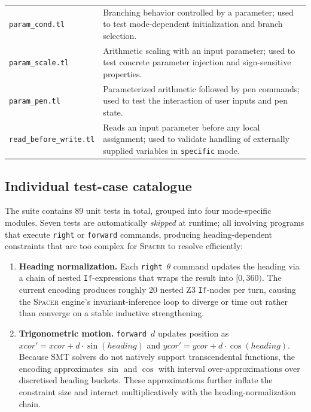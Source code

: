 \begin{longtable}{p{} p{}}
\texttt{param\_cond.tl} & Branching behavior controlled by a parameter; used to test mode-dependent initialization and branch selection. \\
\texttt{param\_scale.tl} & Arithmetic scaling with an input parameter; used to test concrete parameter injection and sign-sensitive properties. \\
\texttt{param\_pen.tl} & Parameterized arithmetic followed by pen commands; used to test the interaction of user inputs and pen state. \\
\texttt{read\_before\_write.tl} & Reads an input parameter before any local assignment; used to validate handling of externally supplied variables in \texttt{specific} mode. \\
\bottomrule
\end{longtable}

\subsection*{Individual test-case catalogue}

The suite contains 89 unit tests in total, grouped into four mode-specific modules.
Seven tests are automatically \emph{skipped} at runtime; all involving
programs that execute \texttt{right} or \texttt{forward} commands, producing
heading-dependent constraints that are too complex for \textsc{Spacer} to resolve
efficiently:

\begin{enumerate}[leftmargin=1.5em]
    \item \textbf{Heading normalization.}
    Each \texttt{right}~$\theta$ command updates the heading via a chain of
    nested \texttt{If}-expressions that wraps the result into $[0,360)$.
    The current encoding produces roughly 20 nested Z3 \texttt{If}-nodes per
    turn, causing the \textsc{Spacer} engine's invariant-inference loop to
    diverge or time out rather than converge on a stable inductive
    strengthening.

    \item \textbf{Trigonometric motion.}
    \texttt{forward}~$d$ updates position as
    $\mathit{xcor}' = \mathit{xcor} + d\cdot\sin(\mathit{heading})$ and
    $\mathit{ycor}' = \mathit{ycor} + d\cdot\cos(\mathit{heading})$.
    Because SMT solvers do not natively support transcendental functions, the
    encoding approximates $\sin$ and $\cos$ with interval
    over-approximations over discretised heading buckets.  These
    approximations further inflate the constraint size and interact
    multiplicatively with the heading-normalization chain.
\end{enumerate}

